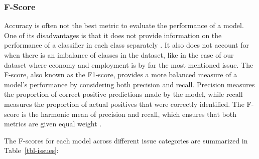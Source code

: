 \documentclass[
  authoryear,
  preprint,
  3p]{elsarticle}
\begin{document}
\subsubsection{F-Score}\label{f-score}

Accuracy is often not the best metric to evaluate the performance of a
model. One of its disadvantages is that it does not provide information
on the performance of a classifier in each class separately
\citep{obi23}. It also does not account for when there is an imbalance
of classes in the dataset, like in the case of our dataset where economy
and employment is by far the most mentioned issue. The F-score, also
known as the F1-score, provides a more balanced measure of a model's
performance by considering both precision and recall. Precision measures
the proportion of correct positive predictions made by the model, while
recall measures the proportion of actual positives that were correctly
identified. The F-score is the harmonic mean of precision and recall,
which ensures that both metrics are given equal weight
\citep{christen_etal24}.

The F-scores for each model across different issue categories are
summarized in Table~\ref{tbl-issues}:
\end{document}
